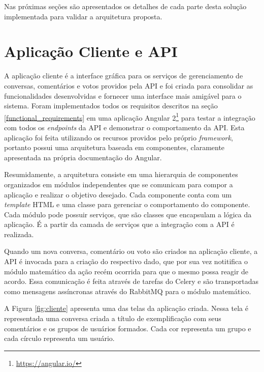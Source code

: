   Nas próximas seções são apresentados os detalhes de cada parte desta solução implementada
  para validar a arquitetura proposta.
  
  
  \section{Aplicação Cliente e API}
    
    A aplicação cliente é a interface gráfica para os serviços de 
    gerenciamento de conversas, comentários e votos providos pela API e foi
    criada para consolidar as funcionalidades desenvolvidas e fornecer uma interface mais
    amigável para o sistema. Foram implementados todos os requisitos descritos na seção \ref{functional_requirements}
    em uma aplicação Angular 2\footnote{\href{https://angular.io/}{https://angular.io/}} para
    testar a integração com todos os \textit{endpoints} da API e demonstrar o comportamento da API. Esta aplicação foi feita utilizando os recursos providos pelo próprio \textit{framework}, portanto
    possui uma arquitetura baseada em componentes, claramente apresentada na própria documentação do Angular.
    
    Resumidamente, a arquitetura consiste em uma hierarquia de componentes organizados
    em módulos independentes que se comunicam para compor a aplicação e realizar o objetivo desejado.
    Cada componente conta com um \textit{template} HTML e uma classe para gerenciar o comportamento do componente.
    Cada módulo pode possuir serviços, que são classes que encapsulam a lógica da aplicação.
    É a partir da camada de serviços que a integração com a API é realizada.
    
    Quando um nova conversa, comentário ou voto são criados na aplicação cliente,
    a API é invocada para a criação do respectivo dado, que por sua vez
    notitifica o módulo matemático da ação recém ocorrida para que o mesmo possa reagir de acordo.
    Essa comunicação é feita através de tarefas do Celery e são transportadas como mensagens assíncronas
    através do RabbitMQ para o módulo matemático.
    
    A Figura \ref{fig:cliente} apresenta uma das telas da aplicação criada. 
    Nessa tela é representada uma conversa criada a título de exemplificação
    com seus comentários e os grupos de usuários formados. Cada cor representa um grupo e cada círculo representa um usuário. 
    
